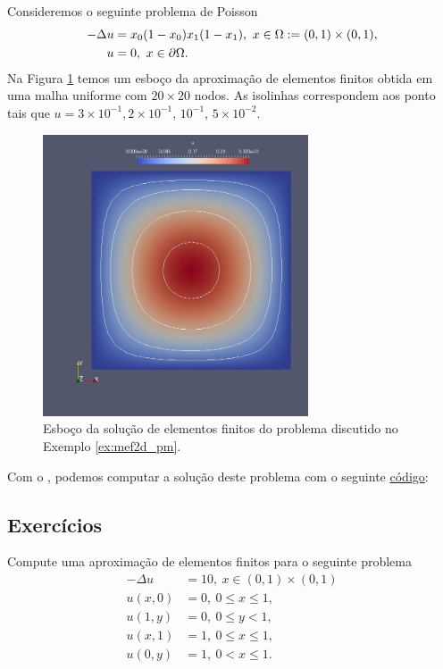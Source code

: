 \begin{ex}\label{ex:mef2d_pm}
  Consideremos o seguinte problema de Poisson
  \begin{align}
    -\Delta u &= x_0(1-x_0)x_1(1-x_1),~x\in\Omega:=(0, 1)\times (0, 1),\\
    u &= 0,~x\in\partial\Omega.
  \end{align}
  Na Figura \ref{fig:mef2d_pm} temos um esboço da aproximação de elementos finitos obtida em uma malha uniforme com $20\times 20$ nodos. As isolinhas correspondem aos ponto tais que $u=3\times 10^{-1}, 2\times 10^{-1}$, $10^{-1}$, $5\times 10^{-2}$.

  \begin{figure}[h!]
    \centering
    \includegraphics[width=0.7\textwidth]{./cap_mef2d/dados/ex_mef2d_pm/fig_mef2d_pm}
    \caption{Esboço da solução de elementos finitos do problema discutido no Exemplo \ref{ex:mef2d_pm}.}
    \label{fig:mef2d_pm}
  \end{figure}

\ifispython
Com o \fenics, podemos computar a solução deste problema com o seguinte \href{https://github.com/phkonzen/notas/blob/master/src/MetodoElementosFinitos/cap_mef2d/dados/ex_mef2d_pm/ex_mef2d_pm.py}{código}:

\fi
\end{ex}

\subsection*{Exercícios}

\begin{exer}
  Compute uma aproximação de elementos finitos para o seguinte problema
\begin{align}
  -\Delta u &= 10,~x\in (0, 1)\times (0, 1)\\
  u(x,0) &= 0,~0\leq x \leq 1,\\
  u(1,y) &= 0,~0\leq y < 1,\\
  u(x,1) &= 1,~0\leq x \leq 1,\\
  u(0,y) &= 1,~0<x\leq 1.
\end{align}
\end{exer}

